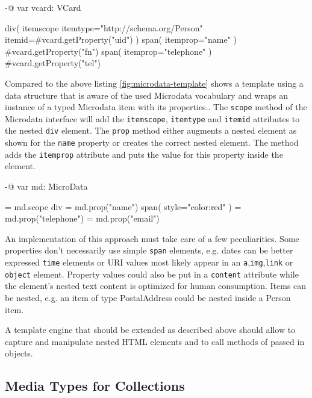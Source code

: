 \documentclass[12pt,a4paper]{scrartcl}		%
\begin{document}
\begin{anylisting}[label=fig:naive-microdata-template,
                   caption={Defining all Microdata attributes manually in an HTML template}]
-@ var vcard: VCard

div( itemscope itemtype="http://schema.org/Person" 
     itemid=#{vcard.getProperty("uid")} )
  span( itemprop="name" )
    #{vcard.getProperty("fn")}
  span( itemprop="telephone" ) 
    #{vcard.getProperty("tel")}
\end{anylisting}

Compared to the above listing \ref{fig:microdata-template} shows a template
using a data structure that is aware of the used Microdata vocabulary and wraps
an instance of a typed Microdata item with its properties.. The
\lstinline:scope: method of the Microdata interface will add the
\lstinline:itemscope:, \lstinline:itemtype: and \lstinline:itemid: attributes to
the nested \lstinline:div: element. The \lstinline:prop: method either augments
a nested element as shown for the \lstinline:name: property or creates the
correct nested element. The method adds the \lstinline:itemprop: attribute and
puts the value for this property inside the element.

\begin{anylisting}[label=fig:microdata-template,
                   caption={Using a Microdata-aware data structure in a template}]
-@ var md: MicroData

= md.scope
  div
    = md.prop("name")
      span( style="color:red" )
    = md.prop("telephone")
    = md.prop("email")
\end{anylisting}

An implementation of this approach must take care of a few
peculiarities.\cite{Hickson2011} Some properties don't necessarily use simple
\lstinline:span: elements, e.g. dates can be better expressed \lstinline:time:
elements or URI values most likely appear in an
\lstinline:a:,\lstinline:img:,\lstinline:link: or \lstinline:object:
element. Property values could also be put in a \lstinline:content: attribute
while the element's nested text content is optimized for human
consumption. Items can be nested, e.g. an item of type PostalAddress could be
nested inside a Person item.

A template engine that should be extended as described above should allow to
capture and manipulate nested HTML elements and to call methods of passed in
objects.

\subsection{Media Types for Collections}
\end{document}

